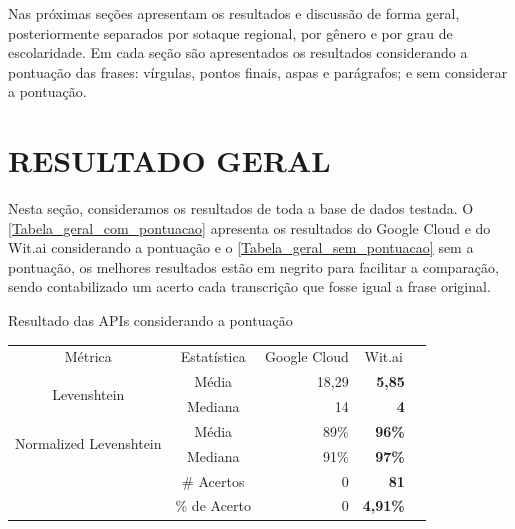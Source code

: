 Nas próximas seções apresentam os resultados e discussão de forma geral, posteriormente separados por sotaque regional, por gênero e por grau de escolaridade. Em cada seção são apresentados os resultados considerando a pontuação das frases: vírgulas, pontos finais, aspas e parágrafos; e sem considerar a pontuação. 

\section{RESULTADO GERAL}

Nesta seção, consideramos os resultados de toda a base de dados testada. O \autoref{Tabela_geral_com_pontuacao} apresenta os resultados do Google Cloud e do Wit.ai considerando a pontuação e o  \autoref{Tabela_geral_sem_pontuacao} sem a pontuação, os melhores resultados estão em negrito para facilitar a comparação, sendo contabilizado um acerto cada transcrição que fosse igual a frase original.

\begin{quadro}[h]
\caption{Resultado das APIs considerando a pontuação} \label{Tabela_geral_com_pontuacao}
\centering
\begin{tabular}{c|c|r|r|l}
\cline{1-4}
\multicolumn{1}{|c|}{Métrica}                                 & Estatística  & \multicolumn{1}{c|}{Google Cloud} & \multicolumn{1}{c|}{Wit.ai} &  \\ \cline{1-4}
\multicolumn{1}{|c|}{\multirow{2}{*}{Levenshtein}}            & Média        & 18,29                           & \textbf{5,85}                      &  \\ \cline{2-4}
\multicolumn{1}{|c|}{}                                        & Mediana      & 14                                & \textbf{4}                           &  \\ \cline{1-4}
\multicolumn{1}{|c|}{\multirow{2}{*}{Normalized Levenshtein}} & Média        & 89\%                            & \textbf{96\%}                      &  \\ \cline{2-4}
\multicolumn{1}{|c|}{}                                        & Mediana      & 91\%                            & \textbf{97\%}                  &  \\ \cline{1-4}
\multicolumn{1}{l|}{}                                         & \# Acertos   & 0                                 & \textbf{81}                          &  \\ \cline{2-4}
\multicolumn{1}{l|}{}                                         & \% de Acerto & 0                                 & \textbf{4,91\%}               &  \\ \cline{2-4}
\end{tabular}
\end{quadro}


